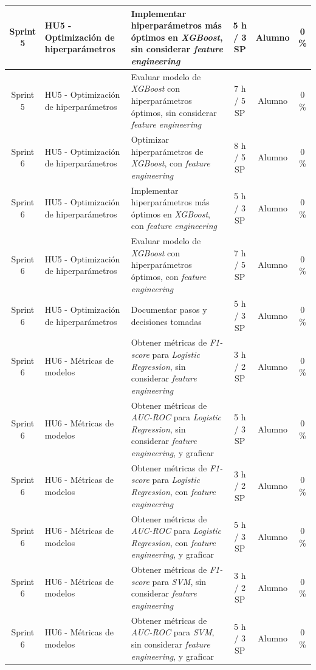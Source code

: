\documentclass[
11pt, %
]{charter}
\begin{document}
\begin{xltabular}{\linewidth}{@{}|c|X|X|c|c|c|@{}}
Sprint 5 & HU5 - Optimización de hiperparámetros & Implementar hiperparámetros más óptimos en \textit{XGBoost}, sin considerar \textit{feature engineering} & 5 h / 3 SP & Alumno & 0 \% \\ \hline
Sprint 5 & HU5 - Optimización de hiperparámetros & Evaluar modelo de \textit{XGBoost} con hiperparámetros óptimos, sin considerar \textit{feature engineering}  & 7 h / 5 SP & Alumno & 0 \% \\ \hline
Sprint 6 & HU5 - Optimización de hiperparámetros & Optimizar hiperparámetros de \textit{XGBoost}, con \textit{feature engineering}  & 8 h / 5 SP & Alumno & 0 \%\\ \hline
Sprint 6 & HU5 - Optimización de hiperparámetros & Implementar hiperparámetros más óptimos en \textit{XGBoost}, con \textit{feature engineering}  & 5 h / 3 SP & Alumno & 0 \% \\ \hline
Sprint 6 & HU5 - Optimización de hiperparámetros & Evaluar modelo de \textit{XGBoost} con hiperparámetros óptimos, con \textit{feature engineering}  & 7 h / 5 SP & Alumno & 0 \% \\ \hline
Sprint 6 & HU5 - Optimización de hiperparámetros & Documentar pasos y decisiones tomadas  & 5 h / 3 SP & Alumno & 0 \% \\ \hline
Sprint 6 & HU6 - Métricas de modelos & Obtener métricas de \textit{F1-score} para \textit{Logistic Regression}, sin  considerar \textit{feature engineering}  & 3 h / 2 SP & Alumno & 0 \%\\ \hline
Sprint 6 & HU6 - Métricas de modelos & Obtener métricas de \textit{AUC-ROC} para \textit{Logistic Regression}, sin  considerar \textit{feature engineering}, y graficar  & 5 h / 3 SP & Alumno & 0 \%\\ \hline
Sprint 6 & HU6 - Métricas de modelos & Obtener métricas de \textit{F1-score} para \textit{Logistic Regression}, con \textit{feature engineering}  & 3 h / 2 SP & Alumno & 0 \%\\ \hline
Sprint 6 & HU6 - Métricas de modelos & Obtener métricas de \textit{AUC-ROC} para \textit{Logistic Regression}, con \textit{feature engineering}, y graficar  & 5 h / 3 SP & Alumno & 0 \%\\ \hline
Sprint 6 & HU6 - Métricas de modelos & Obtener métricas de \textit{F1-score} para \textit{SVM}, sin  considerar \textit{feature engineering}  & 3 h / 2 SP & Alumno & 0 \%\\ \hline
Sprint 6 & HU6 - Métricas de modelos & Obtener métricas de \textit{AUC-ROC} para \textit{SVM}, sin  considerar \textit{feature engineering}, y graficar  & 5 h / 3 SP & Alumno & 0 \%\\ \hline

\end{xltabular}
\end{document}
